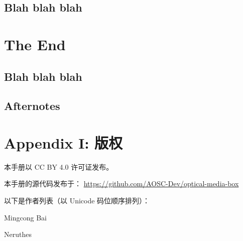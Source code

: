     \section{Blah blah blah}
    \lipsum[1]



    \chapter{The End}
    \lipsum[1]
    
    \section{Blah blah blah}
    \lipsum[1]
    


    \section*{Afternotes}
    \lipsum[1]
    
    \lipsum[1]



    \chapter*{Appendix I: 版权}

    本手册以 CC BY 4.0 许可证发布。

    本手册的源代码发布于：\newline
    \hspace{2em}\underline{\ttfamily\footnotesize{https://github.com/AOSC-Dev/optical-media-box}}

    以下是作者列表（以 Unicode 码位顺序排列）：

    \begin{compactitem}
        \item Mingcong Bai
        \item Neruthes
    \end{compactitem}

    \pagestyle{empty}
    \cleardoublepage
